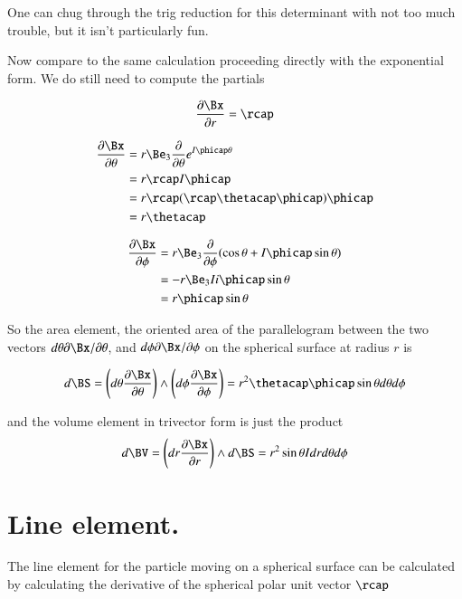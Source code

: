 One can chug through the trig reduction for this determinant with not too much trouble, but it isn't particularly fun.

Now compare to the same calculation proceeding directly with the exponential form.  We do still need to compute the partials

\begin{align*}
\frac{\partial \Bx}{\partial r} = \rcap
\end{align*}

\begin{align*}
\frac{\partial \Bx}{\partial \theta} 
&= r \Be_3 \frac{\partial }{\partial \theta} e^{I\phicap \theta} \\
&= r \rcap I \phicap \\
&= r \rcap (\rcap \thetacap \phicap) \phicap \\
&= r \thetacap
\end{align*}

\begin{align*}
\frac{\partial \Bx}{\partial \phi} 
&= r \Be_3 \frac{\partial }{\partial \phi} (\cos\theta + I\phicap \sin\theta) \\
&= -r \Be_3 I i \phicap \sin\theta \\
&= r \phicap \sin\theta 
\end{align*}

So the area element, the oriented area of the parallelogram between the two vectors $d\theta \partial \Bx/\partial \theta$, and $d\phi \partial \Bx/\partial \phi$ on the spherical surface at radius $r$ is

\begin{align}\label{eqn:sphericalPolarUnit:foo10}
d\BS = \left(d\theta \frac{\partial \Bx}{\partial \theta}\right) \wedge \left( d\phi \frac{\partial \Bx}{\partial \phi} \right) 
= r^2 \thetacap \phicap \sin\theta d\theta d\phi
\end{align}

and the volume element in trivector form is just the product
\begin{align}\label{eqn:sphericalPolarUnit:foo11}
d\BV = \left(dr\frac{\partial \Bx}{\partial r}\right) \wedge d\BS
= r^2 \sin\theta I dr d\theta d\phi
\end{align}

\section{Line element.}

The line element for the particle moving on a spherical surface can be calculated by calculating the derivative of the spherical polar unit vector $\rcap$

